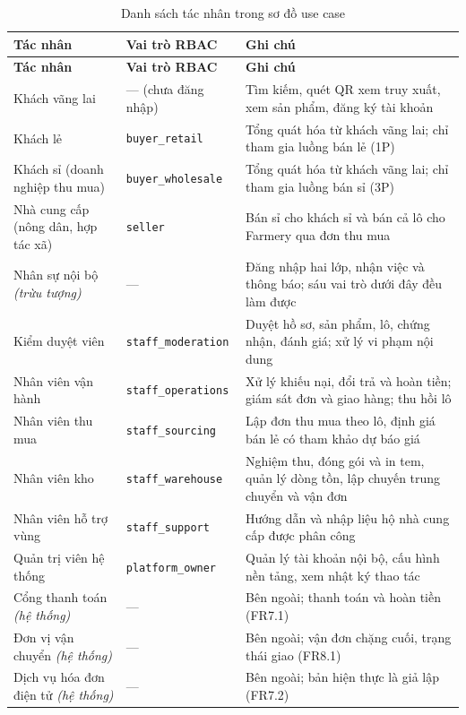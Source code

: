 \begingroup
\tblsetup\tblzebra
\begin{longtable}{L{4.10cm} L{3.75cm} L{6.70cm}}
\caption{Danh sách tác nhân trong sơ đồ use case}
\label{tab:actor-usecase} \\
\toprule
{}
\textbf{Tác nhân} & \textbf{Vai trò RBAC} & \textbf{Ghi chú} \\
\midrule
\endfirsthead
\toprule
{}
\textbf{Tác nhân} & \textbf{Vai trò RBAC} & \textbf{Ghi chú} \\
\midrule
\endhead
\bottomrule
\endfoot
Khách vãng lai & --- (chưa đăng nhập) & Tìm kiếm, quét QR xem truy xuất, xem sản phẩm, đăng ký tài khoản \\
Khách lẻ & \texttt{buyer\_retail} & Tổng quát hóa từ khách vãng lai; chỉ tham gia luồng bán lẻ (1P) \\
Khách sỉ (doanh nghiệp thu mua) & \texttt{buyer\_wholesale} & Tổng quát hóa từ khách vãng lai; chỉ tham gia luồng bán sỉ (3P) \\
Nhà cung cấp (nông dân, hợp tác xã) & \texttt{seller} & Bán sỉ cho khách sỉ và bán cả lô cho Farmery qua đơn thu mua \\
Nhân sự nội bộ \textit{(trừu tượng)} & --- & Đăng nhập hai lớp, nhận việc và thông báo; sáu vai trò dưới đây đều làm được \\
Kiểm duyệt viên & \texttt{staff\_moderation} & Duyệt hồ sơ, sản phẩm, lô, chứng nhận, đánh giá; xử lý vi phạm nội dung \\
Nhân viên vận hành & \texttt{staff\_operations} & Xử lý khiếu nại, đổi trả và hoàn tiền; giám sát đơn và giao hàng; thu hồi lô \\
Nhân viên thu mua & \texttt{staff\_sourcing} & Lập đơn thu mua theo lô, định giá bán lẻ có tham khảo dự báo giá \\
Nhân viên kho & \texttt{staff\_warehouse} & Nghiệm thu, đóng gói và in tem, quản lý dòng tồn, lập chuyến trung chuyển và vận đơn \\
Nhân viên hỗ trợ vùng & \texttt{staff\_support} & Hướng dẫn và nhập liệu hộ nhà cung cấp được phân công \\
Quản trị viên hệ thống & \texttt{platform\_owner} & Quản lý tài khoản nội bộ, cấu hình nền tảng, xem nhật ký thao tác \\
Cổng thanh toán \textit{(hệ thống)} & --- & Bên ngoài; thanh toán và hoàn tiền (FR7.1) \\
Đơn vị vận chuyển \textit{(hệ thống)} & --- & Bên ngoài; vận đơn chặng cuối, trạng thái giao (FR8.1) \\
Dịch vụ hóa đơn điện tử \textit{(hệ thống)} & --- & Bên ngoài; bản hiện thực là giả lập (FR7.2) \\
\end{longtable}
\endgroup

